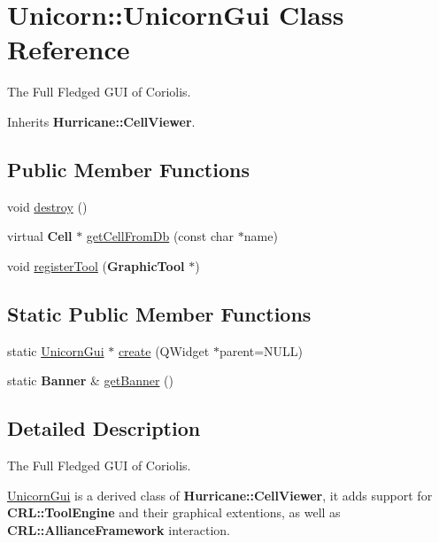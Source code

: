 \hypertarget{classUnicorn_1_1UnicornGui}{\section{Unicorn\-:\-:Unicorn\-Gui Class Reference}
\label{classUnicorn_1_1UnicornGui}
}


The Full Fledged G\-U\-I of Coriolis.  




Inherits {\bf Hurricane\-::\-Cell\-Viewer}.

\subsection*{Public Member Functions}
\begin{DoxyCompactItemize}
\item 
void \hyperlink{classUnicorn_1_1UnicornGui_a7cff59c0e315b6f46f7cb4454732cd7a}{destroy} ()
\item 
virtual {\bf Cell} $\ast$ \hyperlink{classUnicorn_1_1UnicornGui_a698cb62a4c8df9fd6b7d626fb44cc439}{get\-Cell\-From\-Db} (const char $\ast$name)
\item 
void \hyperlink{classUnicorn_1_1UnicornGui_a89346bccf1908c92786987d046aa6175}{register\-Tool} ({\bf Graphic\-Tool} $\ast$)
\end{DoxyCompactItemize}
\subsection*{Static Public Member Functions}
\begin{DoxyCompactItemize}
\item 
static \hyperlink{classUnicorn_1_1UnicornGui}{Unicorn\-Gui} $\ast$ \hyperlink{classUnicorn_1_1UnicornGui_a8a7a37531e1596b9396c61598ee55bc2}{create} (Q\-Widget $\ast$parent=N\-U\-L\-L)
\item 
static {\bf Banner} \& \hyperlink{classUnicorn_1_1UnicornGui_a87215204ace67db47db09f5d9e78b85e}{get\-Banner} ()
\end{DoxyCompactItemize}


\subsection{Detailed Description}
The Full Fledged G\-U\-I of Coriolis. 

\hyperlink{classUnicorn_1_1UnicornGui}{Unicorn\-Gui} is a derived class of {\bf Hurricane\-::\-Cell\-Viewer}, it adds support for {\bf C\-R\-L\-::\-Tool\-Engine} and their graphical extentions, as well as {\bf C\-R\-L\-::\-Alliance\-Framework} interaction. 

